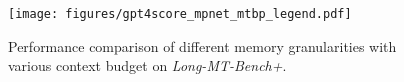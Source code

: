 \begin{figure}[htbp]
\centering
\hspace{1.65em} \texttt{[image: figures/gpt4score\_mpnet\_mtbp\_legend.pdf]}
\vspace{-4mm}
\\
\hspace{2em}
\caption{Performance comparison of different memory granularities with various context budget on \textit{Long-MT-Bench+}.}
\label{fig: score_wrt_token}
\end{figure}